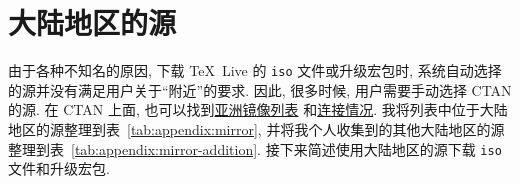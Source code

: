 
\chapter{大陆地区的源}\label{chp:appendix:mirror}

由于各种不知名的原因,
下载 \TeX~Live 的 \texttt{iso} 文件或升级宏包时,
系统自动选择的源并没有满足用户关于``附近''的要求.
因此,
很多时候,
用户需要手动选择 CTAN 的源.
在 CTAN 上面,
也可以找到\href{https://ctan.org/mirrors#Asia}{亚洲镜像列表}%
和\href{https://ctan.org/mirrors/mirmon#cn}{连接情况}.
我将列表中位于大陆地区的源整理到表~\ref{tab:appendix:mirror},
并将我个人收集到的其他大陆地区的源整理到表~\ref{tab:appendix:mirror-addition}.
接下来简述使用大陆地区的源下载 \texttt{iso} 文件和升级宏包.

